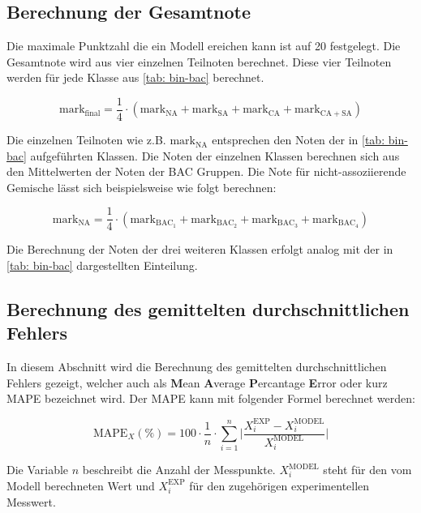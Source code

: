 \documentclass[../thesis.tex]{subfiles}
\begin{document}
\subsection{Berechnung der Gesamtnote}
Die maximale Punktzahl die ein Modell ereichen kann ist auf 20 festgelegt. Die Gesamtnote wird aus vier einzelnen Teilnoten berechnet. Diese vier Teilnoten werden für jede Klasse aus \autoref{tab: bin-bac} berechnet.

\begin{equation}
	\mathrm{mark}_{\mathrm{final}} = \dfrac{1}{4} \cdot \left( 
		\mathrm{mark}_{\mathrm{NA}} + \mathrm{mark}_{\mathrm{SA}} + \mathrm{mark}_{\mathrm{CA}} + \mathrm{mark}_{\mathrm{CA + SA}} 
	 \right)
	 \label{eq: mark_final}
\end{equation}

Die einzelnen Teilnoten wie z.B. $\mathrm{mark}_{\mathrm{NA}}$ entsprechen den Noten der in \autoref{tab: bin-bac} aufgeführten Klassen. Die Noten der einzelnen Klassen berechnen sich aus den Mittelwerten der Noten der BAC Gruppen. Die Note für nicht-assoziierende Gemische lässt sich beispielsweise wie folgt berechnen:

\begin{equation}
	\mathrm{mark}_{\mathrm{NA}} = \dfrac{1}{4} \cdot \left(
		\mathrm{mark}_{\mathrm{BAC_1}} + \mathrm{mark}_{\mathrm{BAC_2}} + \mathrm{mark}_{\mathrm{BAC_3}} + \mathrm{mark}_{\mathrm{BAC_4}}
	\right)
\end{equation}

Die Berechnung der Noten der drei weiteren Klassen erfolgt analog mit der in \autoref{tab: bin-bac} dargestellten Einteilung.

\subsection{Berechnung des gemittelten durchschnittlichen Fehlers}
In diesem Abschnitt wird die Berechnung des gemittelten durchschnittlichen Fehlers gezeigt, welcher auch als \textbf{M}ean \textbf{A}verage \textbf{P}ercantage \textbf{E}rror oder kurz MAPE bezeichnet wird. Der MAPE kann mit folgender Formel berechnet werden:

\begin{equation}
	\mathrm{MAPE}_X(\%) = 100 \cdot \dfrac{1}{n} \cdot \sum_{i=1}^{n} \biggl| \dfrac{X_i^\mathrm{EXP} - X_i^\mathrm{MODEL}}{X_i^\mathrm{MODEL}} \biggr|
	\label{MAPE Glg}
\end{equation}

Die Variable $n$ beschreibt die Anzahl der Messpunkte. $X_i^\mathrm{MODEL}$ steht für den vom Modell berechneten Wert und $X_i^\mathrm{EXP}$ für den zugehörigen experimentellen Messwert.
\end{document}
